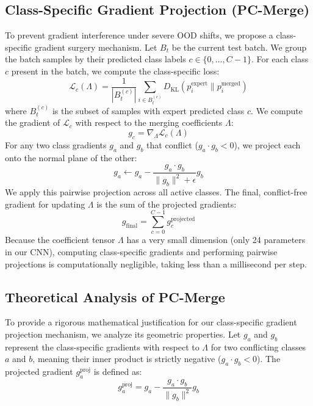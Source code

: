 \documentclass{article}
\theoremstyle{plain}
\theoremstyle{definition}
\theoremstyle{remark}
\begin{document}
\subsection{Class-Specific Gradient Projection (PC-Merge)}
To prevent gradient interference under severe OOD shifts, we propose a class-specific gradient surgery mechanism. Let $B_t$ be the current test batch. We group the batch samples by their predicted class labels $c \in \{0, \dots, C-1\}$. For each class $c$ present in the batch, we compute the class-specific loss:
\begin{equation}
\mathcal{L}_c(\Lambda) = \frac{1}{|B_t^{(c)}|} \sum_{i \in B_t^{(c)}} D_{\text{KL}}(p^{\text{expert}}_{i} \parallel p^{\text{merged}}_{i})
\end{equation}
where $B_t^{(c)}$ is the subset of samples with expert predicted class $c$. We compute the gradient of $\mathcal{L}_c$ with respect to the merging coefficients $\Lambda$:
\begin{equation}
g_c = \nabla_{\Lambda} \mathcal{L}_c(\Lambda)
\end{equation}
For any two class gradients $g_a$ and $g_b$ that conflict ($g_a \cdot g_b < 0$), we project each onto the normal plane of the other:
\begin{equation}
g_a \leftarrow g_a - \frac{g_a \cdot g_b}{\|g_b\|^2 + \epsilon} g_b
\end{equation}
We apply this pairwise projection across all active classes. The final, conflict-free gradient for updating $\Lambda$ is the sum of the projected gradients:
\begin{equation}
g_{\text{final}} = \sum_{c=0}^{C-1} g_c^{\text{projected}}
\end{equation}
Because the coefficient tensor $\Lambda$ has a very small dimension (only 24 parameters in our CNN), computing class-specific gradients and performing pairwise projections is computationally negligible, taking less than a millisecond per step.

\subsection{Theoretical Analysis of PC-Merge}
To provide a rigorous mathematical justification for our class-specific gradient projection mechanism, we analyze its geometric properties. Let $g_a$ and $g_b$ represent the class-specific gradients with respect to $\Lambda$ for two conflicting classes $a$ and $b$, meaning their inner product is strictly negative ($g_a \cdot g_b < 0$). The projected gradient $g_a^{\text{proj}}$ is defined as:
\begin{equation}
g_a^{\text{proj}} = g_a - \frac{g_a \cdot g_b}{\|g_b\|^2} g_b
\end{equation}
\end{document}
